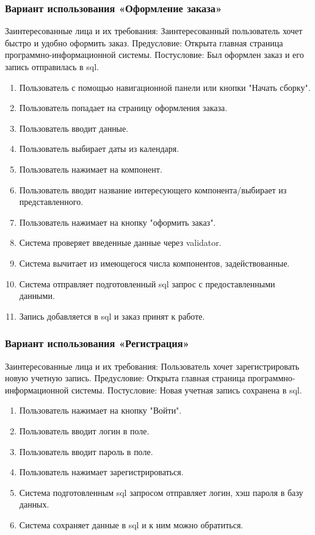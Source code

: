 \subsubsection{Вариант использования «Оформление заказа»}
Заинтересованные лица и их требования: Заинтересованный пользователь хочет быстро и удобно оформить заказ.
Предусловие: Открыта главная страница программно-информационной системы.
Постусловие: Был оформлен заказ и его запись отправилась в sql.
\begin{enumerate}
	\item Пользователь с помощью навигационной панели или кнопки "Начать сборку".
	\item Пользователь попадает на страницу оформления заказа.
	\item Пользователь вводит данные.
	\item Пользователь выбирает даты из календаря.
	\item Пользователь нажимает на компонент.
	\item Пользователь вводит название интересующего компонента/выбирает из представленного.
	\item Пользователь нажимает на кнопку "оформить заказ".
	\item Система проверяет введенные данные через validator.
	\item Система вычитает из имеющегося числа компонентов, задействованные.
	\item Система отправляет подготовленный sql запрос с предоставленными данными.
	\item Запись добавляется в sql и заказ принят к работе.
\end{enumerate}

\subsubsection{Вариант использования «Регистрация»}
Заинтересованные лица и их требования: Пользователь хочет зарегистрировать новую учетную запись.
Предусловие: Открыта главная страница программно-информационной системы.
Постусловие: Новая учетная запись сохранена в sql.
\begin{enumerate}
	\item Пользователь нажимает на кнопку "Войти".
	\item Пользователь вводит логин в поле.
	\item Пользователь вводит пароль в поле.
	\item Пользователь нажимает зарегистрироваться.
	\item Система подготовленным sql запросом отправляет логин, хэш пароля в базу данных.
	\item Система сохраняет данные в sql и к ним можно обратиться.
\end{enumerate}

